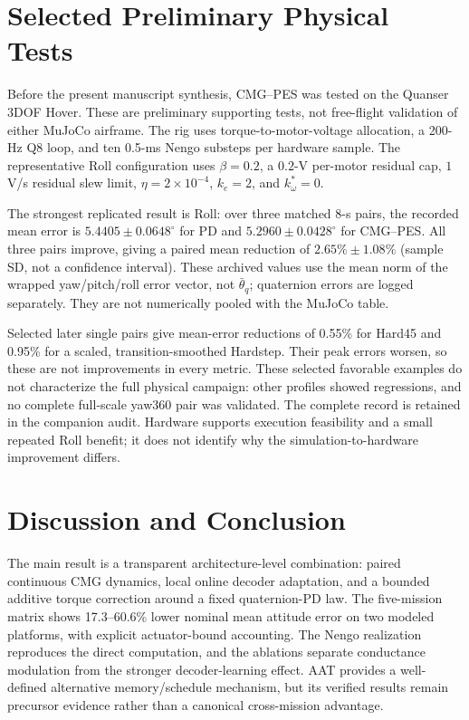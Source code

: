 \documentclass[letterpaper,10pt,conference]{IEEEtran}
\begin{document}
\section{Selected Preliminary Physical Tests}
\label{sec:hover}
Before the present manuscript synthesis, CMG--PES was tested on the
Quanser 3DOF Hover. These are preliminary supporting tests, not free-flight
validation of either MuJoCo airframe. The rig uses torque-to-motor-voltage
allocation, a 200-Hz Q8 loop, and ten 0.5-ms Nengo substeps per hardware
sample. The representative Roll configuration uses $\beta=0.2$, a
$0.2$-V per-motor residual cap, $1$ V/s residual slew limit,
$\eta=2\times10^{-4}$, $k_e=2$, and $k_\omega^*=0$.

The strongest replicated result is Roll: over three matched 8-s pairs,
the recorded mean error is $5.4405\pm0.0648^\circ$ for PD and
$5.2960\pm0.0428^\circ$ for CMG--PES. All three pairs improve, giving a
paired mean reduction of $2.65\%\pm1.08\%$ (sample SD, not a confidence
interval). These archived values use the mean norm of the wrapped
yaw/pitch/roll error vector, not $\bar\theta_q$; quaternion errors are
logged separately. They are not numerically pooled with the MuJoCo table.

Selected later single pairs give mean-error reductions of 0.55\% for
Hard45 and 0.95\% for a scaled, transition-smoothed Hardstep. Their peak
errors worsen, so these are not improvements in every metric. These
selected favorable examples do not characterize the full physical campaign:
other profiles showed regressions, and no complete full-scale yaw360 pair
was validated. The complete record is retained in the companion audit.
Hardware supports execution feasibility and a small repeated Roll benefit;
it does not identify why the simulation-to-hardware improvement differs.

\section{Discussion and Conclusion}
The main result is a transparent architecture-level combination:
paired continuous CMG dynamics, local online decoder adaptation, and a
bounded additive torque correction around a fixed quaternion-PD law.
The five-mission matrix shows 17.3--60.6\% lower nominal mean attitude
error on two modeled platforms, with explicit actuator-bound accounting.
The Nengo realization reproduces the direct computation, and the ablations
separate conductance modulation from the stronger decoder-learning effect.
AAT provides a well-defined alternative memory/schedule mechanism, but
its verified results remain precursor evidence rather than a canonical
cross-mission advantage.
\end{document}
